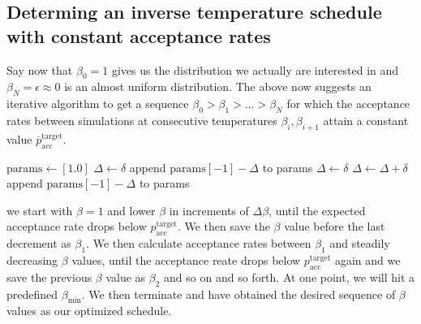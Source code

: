 \documentclass{article}
\begin{document}
\subsection*{Determing an inverse temperature schedule with constant acceptance rates}
Say now that $\beta_0=1$ gives us the distribution we actually are interested in and $\beta_N=\epsilon \approx 0$ is an almost uniform distribution. The above now suggests an iterative algorithm to get a sequence $\beta_0 > \beta_1 > \ldots > \beta_N$ for which the acceptance rates between simulations at consecutive temperatures $\beta_i, \beta_{i+1}$ attain a constant value $\overline p_{\mathrm{acc}}^\mathrm{target}$\cite{habeck_ensemble_annealing}.
\begin{algorithm}
  \begin{algorithmic}
    \STATE $\mathrm{params} \leftarrow  [1.0]$
    \STATE $\Delta \leftarrow \delta$
    \STATE append $\mathrm{params[-1]} - \Delta$ to params
    \STATE $\Delta \leftarrow \delta$
    \ELSE \STATE $\Delta \leftarrow \Delta + \delta$
    \ENDIF
    \ENDWHILE
    \STATE append $\mathrm{params[-1]} - \Delta$ to params
\end{algorithmic}
\end{algorithm}
we start with $\beta = 1$ and lower $\beta$ in increments of $\Delta\beta$, until the expected acceptance rate drops below $p_{\mathrm{acc}}^\mathrm{target}$. We then save the $\beta$ value before the last decrement as $\beta_1$. We then calculate acceptance rates between $\beta_1$ and steadily decreasing $\beta$ values, until the acceptance reate drops below $p_{\mathrm{acc}}^\mathrm{target}$ again and we save the previous $\beta$ value as $\beta_2$ and so on and so forth. At one point, we will hit a predefined $\beta_{\mathrm{min}}$. We then terminate and have obtained the desired sequence of $\beta$ values as our optimized schedule.
\end{document}
